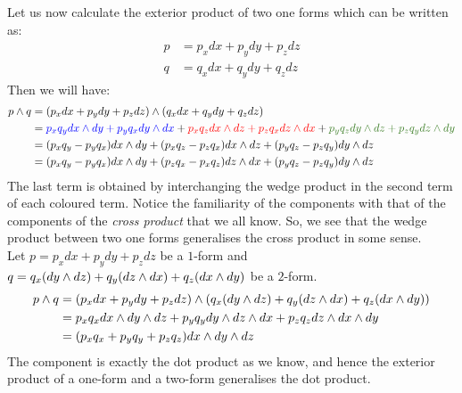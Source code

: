 Let us now calculate the exterior product of two one forms which can be written as:
\begin{align*}
    p &= p_x dx + p_y dy+p_zdz\\
    q &= q_x dx + q_y dy+q_zdz
\end{align*}
Then we will have:
\begin{align*}
    \ext{p}{q} &= \ext{( p_x dx + p_y dy+p_zdz)}{(q_x dx + q_y dy+q_zdz)}\\
    &=\mathcolor{blue}{p_xq_y \ext{dx}{dy} + p_yq_x \ext{dy}{dx}} + \mathcolor{red}{p_xq_z\ext{dx}{dz} + p_zq_x\ext{dz}{dx}}+\mathcolor{OliveGreen}{p_yq_z\ext{dy}{dz} + p_z q_y\ext{dz}{dy}}\\
    &=(p_xq_y - p_yq_x)\ext{dx}{dy} + (p_xq_z-p_zq_x)\ext{dx}{dz}+ (p_yq_z - p_zq_y)\ext{dy}{dz}\\
    &=(p_xq_y - p_yq_x)\ext{dx}{dy} + (p_zq_x-p_xq_z)\ext{dz}{dx} + (p_yq_z - p_zq_y)\ext{dy}{dz}
\end{align*}
The last term is obtained by interchanging the wedge product in the second term of each coloured term. Notice the familiarity of the components with that of the components of the \textit{cross product} that we all know. So, we see that the wedge product between two one forms generalises the cross product in some sense. \\[0.2cm]
Let $p = p_x dx + p_y dy+p_zdz$ be a $1$-form and $q = q_x(dy \wedge dz)+q_y(dz \wedge dx)+q_z( dx \wedge dy) $ be a $2$-form.
\begin{align*}
    p \wedge q &= (p_x dx + p_y dy+p_zdz) \wedge (q_x(dy \wedge dz)+q_y(dz \wedge dx)+q_z( dx \wedge dy))\\
    &= p_xq_xdx \wedge dy \wedge dz+ p_yq_y dy \wedge dz \wedge dx+p_zq_zdz \wedge dx \wedge dy\\
    &=(p_xq_x+p_yq_y+p_zq_z)dx \wedge dy \wedge dz
\end{align*}
The component is exactly the dot product as we know, and hence the exterior product of a one-form and a two-form generalises the dot product. 